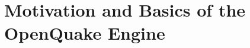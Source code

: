 \documentclass[11pt,a4paper,headings=small,dvips]{scrbook}
\begin{document}
\chapter{Motivation and Basics of the OpenQuake Engine}
	
%	
%	
%	
%	
%	
%	
%	
%	
%	
\end{document}
